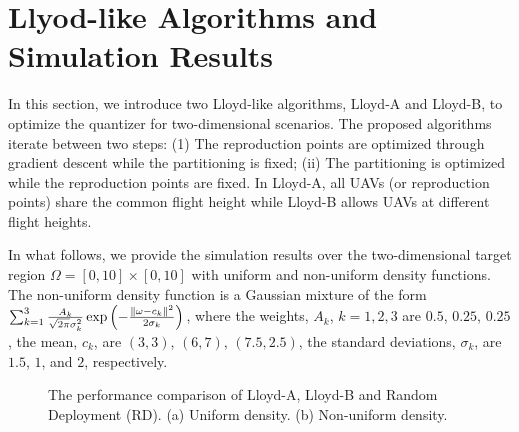 \documentclass[smallabstract,smallcaptions]{dccpaper}
\begin{document}
\section{Llyod-like Algorithms and Simulation Results}
%
In this section, we introduce two Lloyd-like algorithms, Lloyd-A and Lloyd-B, to optimize the quantizer for
two-dimensional scenarios. The proposed
algorithms iterate between two steps: (1) The reproduction points are optimized through gradient descent while the
partitioning is fixed; (ii) The partitioning is optimized while the reproduction points are fixed.  In Lloyd-A, all UAVs
(or reproduction points) share the common flight height while Lloyd-B allows UAVs at different flight heights.

In what follows, we provide the simulation results over the two-dimensional target region $\Omega=[0,10]\times[0,10]$ with
uniform and non-uniform density functions.  The non-uniform density function is a Gaussian mixture of the form
$\sum_{k=1}^{3}\frac{A_k}{\sqrt{2\pi}\sigma^2_k}\exp{\left(-\frac{\|\ensuremath{\omega}-c_k\|^2}{2\sigma_k}\right)}$, where the
weights, $A_k$, $k=1,2,3$ are $0.5$, $0.25$, $0.25$, the mean, $c_k$, are $(3,3)$, $(6,7)$, $(7.5,2.5)$, the standard deviations,
$\sigma_k$, are  $1.5$, $1$, and $2$, respectively.


\begin{figure}[!htb]
\setlength\abovecaptionskip{0pt}
\setlength\belowcaptionskip{0pt}
\centering
{}
\hfil
{}
\captionsetup{justification=justified}
\caption{\small{The performance comparison of Lloyd-A, Lloyd-B and Random Deployment (RD). 
(a) Uniform density. (b) Non-uniform density.}}
\label{Distortion}
\end{figure}
\end{document}

